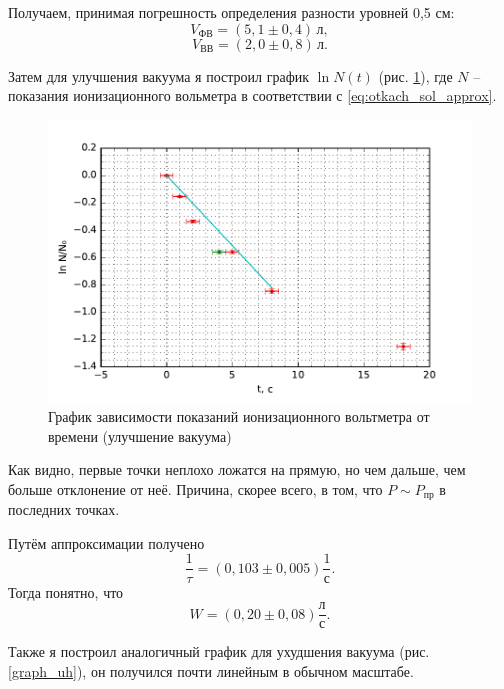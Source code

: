 \documentclass[12pt]{article}
\newcommand{\fref}[1]{рис. \ref{#1}}
\begin{document}
	Получаем, принимая погрешность определения разности уровней 0,5 см: $$ V_\text{ФВ}=(5{,}1\pm 0{,}4) \,\text{л}, $$  $$ V_\text{ВВ}=(2{,}0\pm 0{,}8) \,\text{л}. $$
	
	Затем для улучшения вакуума я построил график $\ln N(t)$ (\fref{graph_ul}), где $N$ -- показания ионизационного вольметра в соответствии с \eqref{eq:otkach_sol_approx}.
	
	\begin{figure}[!h]
		\caption{График зависимости показаний ионизационного вольтметра от времени (улучшение вакуума)}
		\label{graph_ul}
		\begin{center}
		\includegraphics[scale=.8]{graph2.pdf}
		\end{center}
	\end{figure}
	
	Как видно, первые точки неплохо ложатся на прямую, но чем дальше, чем больше отклонение от неё. Причина, скорее всего, в том, что $P \sim P_\text{пр}$ в последних точках.
	
	Путём аппроксимации получено $$ \frac{1}{\tau}=(0{,}103\pm 0{,}005) \frac{1}{\text{с}}. $$ Тогда понятно, что $$ W=(0{,}20\pm 0{,}08) \frac{\text{л}}{\text{с}}. $$
	
	Также я построил аналогичный график для ухудшения вакуума (\fref{graph_uh}), он получился почти линейным в обычном масштабе.
	
\end{document}
